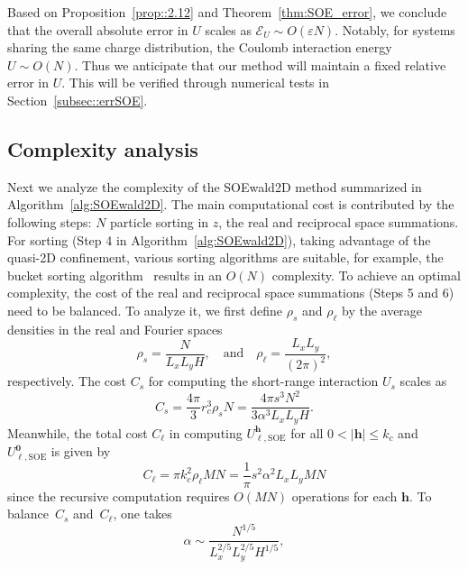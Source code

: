 Based on Proposition~\ref{prop::2.12} and Theorem~\ref{thm:SOE_error}, we conclude that the overall absolute error in $U$ scales as $\mathscr{E}_{U}\sim O(\varepsilon N)$. 
Notably, for systems sharing the same charge distribution, the Coulomb interaction energy $U \sim O(N)$. 
Thus we anticipate that our method will maintain a fixed relative error in $U$. 
This will be verified through numerical tests in Section~\ref{subsec::errSOE}.

\subsection{Complexity analysis}

Next we analyze the complexity of the SOEwald2D method summarized in Algorithm~\ref{alg:SOEwald2D}. 
The main computational cost is contributed by the following steps: $N$ particle sorting in $z$, the real and reciprocal space summations.
For sorting (Step 4 in Algorithm~\ref{alg:SOEwald2D}), taking advantage of the quasi-2D confinement, various sorting algorithms are suitable, for example, the bucket sorting algorithm~\cite{cormen2022introduction} results in an $O(N)$ complexity.
To achieve an optimal complexity, the cost of the real and reciprocal space summations (Steps 5 and 6) need to be balanced. 
To analyze it, we first define $\rho_{s}$ and $\rho_{\ell}$ by the average densities in the real and Fourier spaces 
\begin{equation}
	\rho_{s}=\frac{N}{L_x L_y H},\quad \text{and} \quad \rho_{\ell}=\frac{L_xL_y}{(2\pi)^2},
\end{equation}
respectively.
The cost $C_s$ for computing the short-range interaction $U_{s}$ scales as
\begin{equation}\label{eq::cs}
	C_{s}=\frac{4\pi}{3}r_c^3\rho_{s}N=\frac{4\pi s^3N^2}{3\alpha^3 L_x L_y H}.
\end{equation}
Meanwhile, the total cost $ C_{\ell}$ in computing $U_{\ell,\text{SOE}}^{\bm{h}}$ for all $0<|\bm{h}|\leq k_c$ and $U_{\ell,\text{SOE}}^{\bm{0}}$ is given by
\begin{equation}\label{eq::cll}
	C_{\ell} = \pi k_c^2\rho_{\ell}MN = \frac{1}{\pi}s^2 \alpha^2 L_x L_y M N
\end{equation}
since the recursive computation requires $O(MN)$ operations for each $\bm{h}$. 
To balance~$C_{s}$ and~$C_{\ell}$, one takes
\begin{equation}
	\alpha \sim \frac{N^{1/5}}{L_x^{2/5}L_y^{2/5}H^{1/5}},
\end{equation}
